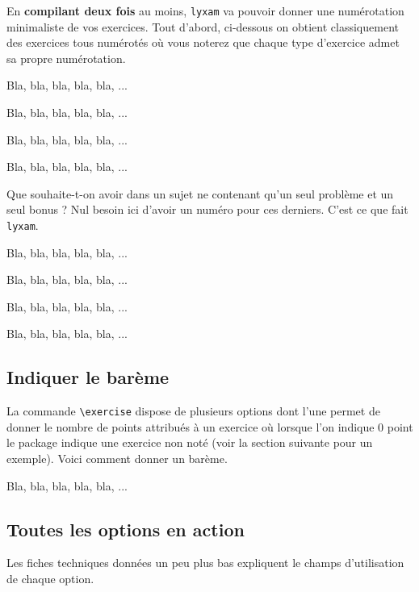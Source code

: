 \documentclass[12pt,a4paper]{scrartcl}
\makeatletter
\theoremstyle{definition}
\newcommand\resetallcnt{
    	\setcounter{lyxam@counter@topic}{0}
    	\setcounter{lyxam@counter@exercise}{0}
    	\setcounter{lyxam@counter@problem}{0}
    	\setcounter{lyxam@counter@bonus}{0}
    	\setcounter{lyxam@counter@subpart}{0}
    }
\makeatother
\begin{document}
En \textbf{compilant deux fois} au moins, \verb+lyxam+ va pouvoir donner une numérotation minimaliste de vos exercices. Tout d'abord, ci-dessous on obtient classiquement des exercices tous numérotés où vous noterez que chaque type d'exercice admet sa propre numérotation.


\begin{tcblisting}{}
\exercise
Bla, bla, bla, bla, bla, ...

\exercise
Bla, bla, bla, bla, bla, ...

\problem
Bla, bla, bla, bla, bla, ...

\problem
Bla, bla, bla, bla, bla, ...
\end{tcblisting}


Que souhaite-t-on avoir dans un sujet ne contenant qu'un seul problème et un seul bonus ? Nul besoin ici d'avoir un numéro pour ces derniers. C'est ce que fait \verb+lyxam+.

\resetallcnt{}

\begin{tcblisting}{}
\exercise
Bla, bla, bla, bla, bla, ...

\exercise
Bla, bla, bla, bla, bla, ...

\problem
Bla, bla, bla, bla, bla, ...

\bonus
Bla, bla, bla, bla, bla, ...
\end{tcblisting}



    \subsection{Indiquer le barème}

La commande \verb+\exercise+ dispose de plusieurs options dont l'une permet de donner le nombre de points attribués à un exercice où lorsque l'on indique $0$ point le package indique une exercice non noté (voir la section suivante pour un exemple). Voici comment donner un barème.

\resetallcnt{}

\begin{tcblisting}{}
\exercise[pts = 5]
Bla, bla, bla, bla, bla, ...
\end{tcblisting}


    \subsection{Toutes les options en action}

Les fiches techniques données un peu plus bas expliquent le champs d'utilisation de chaque option.
\end{document}
